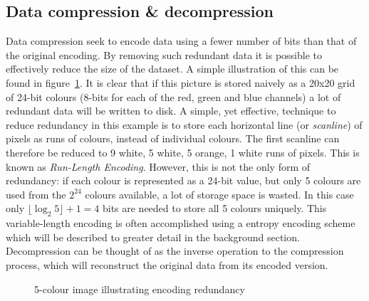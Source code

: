 \subsection{Data compression \& decompression}
Data compression seek to encode data using a fewer number of bits than that of the original encoding. By removing such redundant data it is possible to effectively 
reduce the size of the dataset. A simple illustration of this can be found in figure~\ref{COMP_ILLUS}. It is clear that if this picture is stored naively as a 20x20
grid of 24-bit colours (8-bits for each of the red, green and blue channels) a lot of redundant data will be written to disk. A simple, yet effective, technique to 
reduce redundancy in this example is to store each horizontal line (or \textit{scanline}) of pixels as runs of colours, instead of individual colours. The first 
scanline can therefore be reduced to 9 white, 5 white, 5 orange, 1 white runs of pixels. This is known as \textit{Run-Length Encoding}. However, this is not the only 
form of redundancy: if each colour is represented as a 24-bit value, but only 5 colours are used from the $2^{24}$ colours available, a lot of storage space is wasted. 
In this case only  $\lfloor\log_{2}{5}\rfloor+1 = 4$ bits are needed to store all 5 colours uniquely. This variable-length encoding is often accomplished using a 
entropy encoding scheme which will be described to greater detail in the background section. Decompression can be thought of as the inverse operation to the compression 
process, which will reconstruct the original data from its encoded version.
\begin{figure}[ht!]
  \centering
 \caption{5-colour image illustrating encoding redundancy}
 \label{COMP_ILLUS}
\end{figure}

